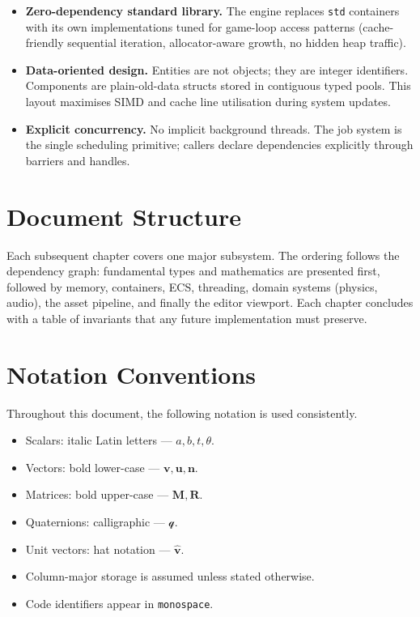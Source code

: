 \documentclass[12pt, a4paper]{report}
\theoremstyle{definition}
\theoremstyle{remark}
\begin{document}
\begin{itemize}[leftmargin=1.5em]
  \item \textbf{Zero-dependency standard library.} The engine replaces
        \texttt{std} containers with its own implementations tuned for
        game-loop access patterns (cache-friendly sequential iteration,
        allocator-aware growth, no hidden heap traffic).

  \item \textbf{Data-oriented design.} Entities are not objects; they are
        integer identifiers. Components are plain-old-data structs stored in
        contiguous typed pools. This layout maximises SIMD and cache line
        utilisation during system updates.

  \item \textbf{Explicit concurrency.} No implicit background threads.
        The job system is the single scheduling primitive; callers declare
        dependencies explicitly through barriers and handles.
\end{itemize}

\section{Document Structure}

Each subsequent chapter covers one major subsystem. The ordering follows
the dependency graph: fundamental types and mathematics are presented first,
followed by memory, containers, ECS, threading, domain systems (physics,
audio), the asset pipeline, and finally the editor viewport. Each chapter
concludes with a table of invariants that any future implementation must
preserve.

\section{Notation Conventions}

Throughout this document, the following notation is used consistently.

\begin{itemize}[leftmargin=1.5em]
  \item Scalars: italic Latin letters — $a, b, t, \theta$.
  \item Vectors: bold lower-case — $\mathbf{v}, \mathbf{u}, \mathbf{n}$.
  \item Matrices: bold upper-case — $\mathbf{M}, \mathbf{R}$.
  \item Quaternions: calligraphic — $\mathcal{q}$.
  \item Unit vectors: hat notation — $\hat{\mathbf{v}}$.
  \item Column-major storage is assumed unless stated otherwise.
  \item Code identifiers appear in \texttt{monospace}.
\end{itemize}
\end{document}

